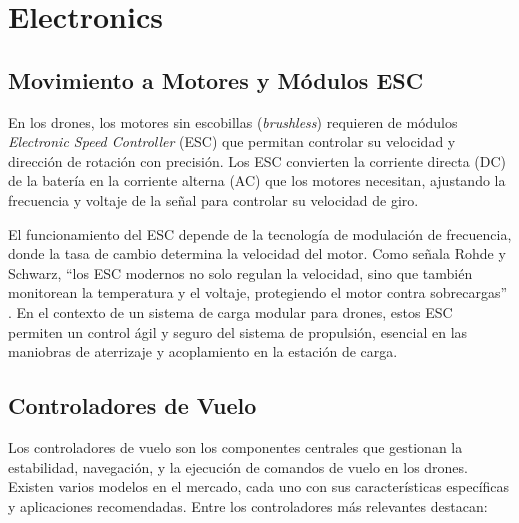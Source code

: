 
\section{Electronics}

\subsection{Movimiento a Motores y Módulos ESC}

En los drones, los motores sin escobillas (\textit{brushless}) requieren de módulos \textit{Electronic Speed Controller} (ESC) que permitan controlar su velocidad y dirección de rotación con precisión. Los ESC convierten la corriente directa (DC) de la batería en la corriente alterna (AC) que los motores necesitan, ajustando la frecuencia y voltaje de la señal para controlar su velocidad de giro. 

El funcionamiento del ESC depende de la tecnología de modulación de frecuencia, donde la tasa de cambio determina la velocidad del motor. Como señala Rohde y Schwarz, “los ESC modernos no solo regulan la velocidad, sino que también monitorean la temperatura y el voltaje, protegiendo el motor contra sobrecargas” \cite{rohdE_ESC}. En el contexto de un sistema de carga modular para drones, estos ESC permiten un control ágil y seguro del sistema de propulsión, esencial en las maniobras de aterrizaje y acoplamiento en la estación de carga.

\subsection{Controladores de Vuelo}

Los controladores de vuelo son los componentes centrales que gestionan la estabilidad, navegación, y la ejecución de comandos de vuelo en los drones. Existen varios modelos en el mercado, cada uno con sus características específicas y aplicaciones recomendadas. Entre los controladores más relevantes destacan:

